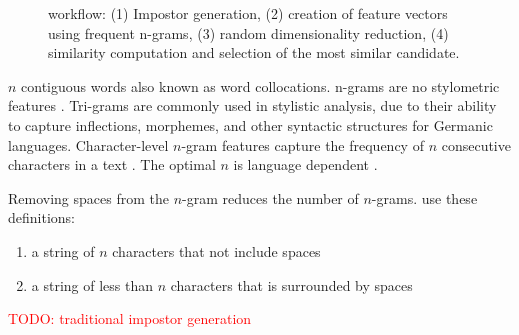\begin{figure}[htbp]
    \centering
    
    \caption{\impAppr{} workflow: (1) Impostor generation, (2) creation of feature vectors using frequent n-grams, (3) random dimensionality reduction, (4) similarity computation and selection of the most similar candidate.}
    \label{fig:impostor}
\end{figure}



  \begin{definition}
    [n-gram]
    $n$ contiguous words also known as word collocations. 
    n-grams are no stylometric features \citep{altakrori_topic_2021}.
    Tri-grams are commonly used in stylistic analysis, due to their ability to capture inflections, %
    morphemes, %
    and other syntactic structures for Germanic languages.
    Character-level $n$-gram features capture the frequency of $n$ consecutive characters in a text \citep{neal_surveying_2018}.
    The optimal $n$ is language dependent \citep{neal_surveying_2018}.
\end{definition}

\begin{definition}
    Removing spaces from the $n$-gram reduces the number of $n$-grams.
    \citet{koppel_authorship_2011} use these definitions:
    \begin{enumerate}
        \item a string of $n$ characters that not include spaces
        \item a string of less than $n$ characters that is surrounded by spaces
    \end{enumerate}
\end{definition}

\textcolor{red}{TODO: traditional impostor generation}

